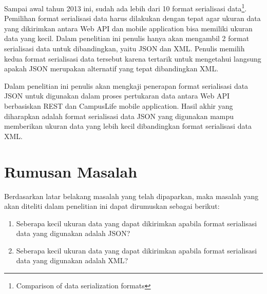 \documentclass[a4paper, 12pt]{report}
\begin{document}
\onehalfspacing Sampai awal tahun 2013 ini, sudah ada lebih dari 10 format serialisasi data\footnote{Comparison of data serialization formats}. Pemilihan format serialisasi data harus dilakukan dengan tepat agar ukuran data yang dikirimkan antara Web API dan mobile application bisa memiliki ukuran data yang kecil. Dalam penelitian ini penulis hanya akan mengambil 2 format serialisasi data untuk dibandingkan, yaitu JSON dan XML. Penulis memilih kedua format serialisasi data tersebut karena tertarik untuk mengetahui langsung apakah JSON merupakan alternatif yang tepat dibandingkan XML.

\onehalfspacing Dalam penelitian ini penulis akan mengkaji penerapan format serialisasi data JSON untuk digunakan dalam proses pertukaran data antara Web API berbasiskan REST dan CampusLife mobile application. Hasil akhir yang diharapkan adalah format serialisasi data JSON yang digunakan mampu memberikan ukuran data yang lebih kecil dibandingkan format serialisasi data XML.\cite{json-fat-free}

\section*{Rumusan Masalah}
\onehalfspacing Berdasarkan latar belakang masalah yang telah dipaparkan, maka masalah yang akan diteliti dalam penelitian ini dapat dirumuskan sebagai berikut:
\begin{enumerate}
  \item Seberapa kecil ukuran data yang dapat dikirimkan apabila format serialisasi data yang digunakan adalah JSON?
  \item Seberapa kecil ukuran data yang dapat dikirimkan apabila format serialisasi data yang digunakan adalah XML?
\end{enumerate}
\end{document}
